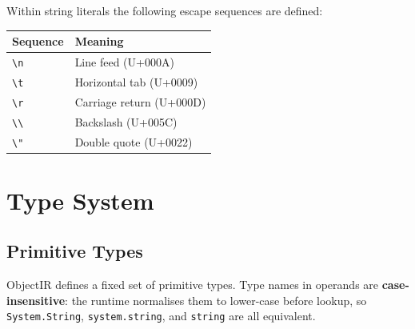 \documentclass[11pt,a4paper]{article}
\begin{document}
Within string literals the following escape sequences are defined:

\begin{center}
\begin{tabular}{ll}
  \toprule
  \textbf{Sequence} & \textbf{Meaning} \\
  \midrule
  \texttt{\textbackslash n}              & Line feed (U+000A) \\
  \texttt{\textbackslash t}              & Horizontal tab (U+0009) \\
  \texttt{\textbackslash r}              & Carriage return (U+000D) \\
  \texttt{\textbackslash\textbackslash}  & Backslash (U+005C) \\
  \texttt{\textbackslash"}              & Double quote (U+0022) \\
  \bottomrule
\end{tabular}
\end{center}

\section{Type System}
\label{sec:types}

\subsection{Primitive Types}

ObjectIR defines a fixed set of primitive types. Type names in operands are
\textbf{case-insensitive}: the runtime normalises them to lower-case before
lookup, so \texttt{System.String}, \texttt{system.string}, and \texttt{string}
are all equivalent.
\end{document}

